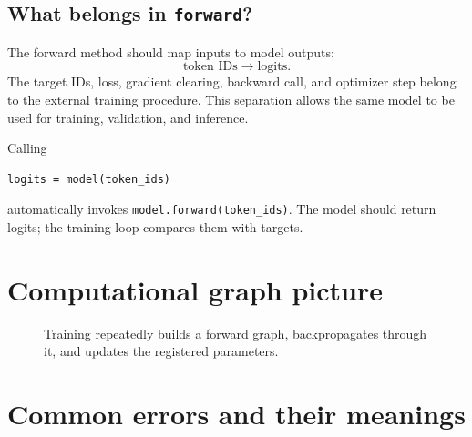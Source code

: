 \documentclass[11pt]{article}
\begin{document}
\subsection{What belongs in \texttt{forward}?}

The forward method should map inputs to model outputs:
\[
\text{token IDs}\longrightarrow\text{logits}.
\]
The target IDs, loss, gradient clearing, backward call, and optimizer step belong to the external training
procedure. This separation allows the same model to be used for training, validation, and inference.

Calling
\begin{lstlisting}
logits = model(token_ids)
\end{lstlisting}
automatically invokes \texttt{model.forward(token\_ids)}. The model should return logits; the training loop
compares them with targets.

\section{Computational graph picture}

\begin{figure}[ht]
\centering
{}
\caption{Training repeatedly builds a forward graph, backpropagates through it, and updates the registered parameters.}
\end{figure}

\section{Common errors and their meanings}
\end{document}
